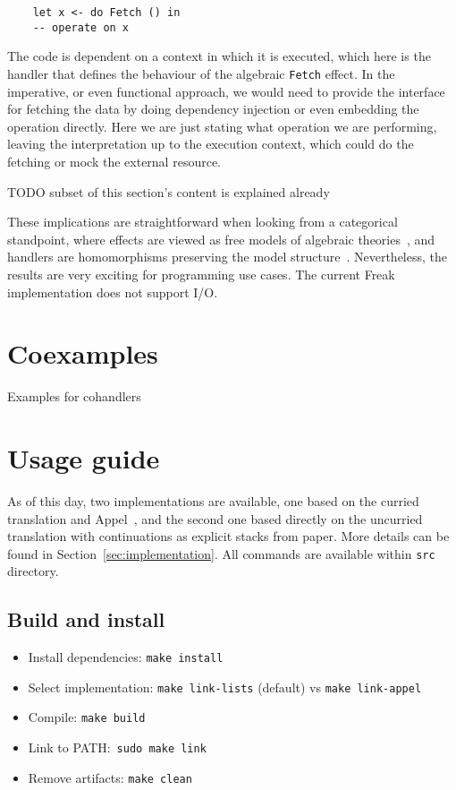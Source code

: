 \documentclass[declaration,shortabstract]{iithesis}
\theoremstyle{definition} \newtheorem{definition}{Definition}[chapter]
\theoremstyle{remark} \newtheorem{remark}[definition]{Observation}
\theoremstyle{plain} \newtheorem{theorem}[definition]{Theorem}
\theoremstyle{plain} \newtheorem{lemma}[definition]{Lemma}
\begin{document}
    \begin{verbatim}
    let x <- do Fetch () in
    -- operate on x
    \end{verbatim}

    The code is dependent on a context in which it is executed, which here is
    the handler that defines the behaviour of the algebraic \verb!Fetch! effect.
    In the imperative, or even functional approach, we would need to provide
    the interface for fetching the data by doing dependency injection or even
    embedding the operation directly. Here we are just stating what operation
    we are performing, leaving the interpretation up to the execution context,
    which could do the fetching or mock the external resource.

    TODO subset of this section's content is explained already

    These implications are straightforward when looking from a categorical standpoint,
    where effects are viewed as free models of algebraic theories~\cite{adequacy},
    and handlers are homomorphisms preserving the model structure~\cite{handlers}.
    Nevertheless, the results are very exciting for programming use cases. The current
    Freak implementation does not support I/O.

\section{Coexamples}

    Examples for cohandlers

\section{Usage guide}

    As of this day, two implementations are available, one based on the curried
    translation and Appel~\cite{appel-continuations}, and the second one based
    directly on the uncurried translation with continuations as explicit stacks
    from paper. More details can be found in Section~\ref{sec:implementation}.
    All commands are available within \verb!src!  directory.

    \subsection{Build and install}

    \begin{itemize}
        \item Install dependencies: \verb!make install!
        \item Select implementation: \verb!make link-lists! (default) vs \verb!make link-appel!
        \item Compile: \verb!make build!
        \item Link to PATH:~\verb!sudo make link!
        \item Remove artifacts: \verb!make clean!
    \end{itemize}
\end{document}
